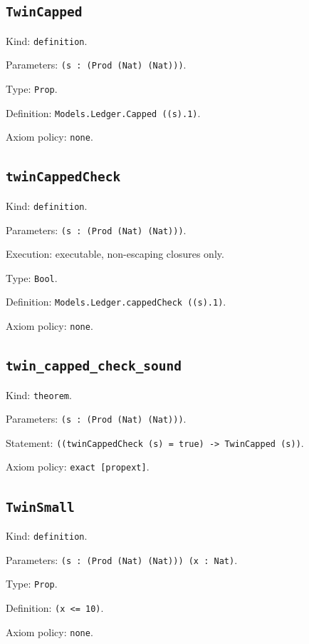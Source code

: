 \documentclass[11pt]{article}
\begin{document}
\subsection*{\texttt{TwinCapped}}
\noindent Kind: \texttt{definition}.\par
\noindent Parameters: \texttt{(s : (Prod (Nat) (Nat)))}.\par
\noindent Type: \texttt{Prop}.\par
\noindent Definition: \texttt{Models.Ledger.Capped ((s).1)}.\par
\noindent Axiom policy: \texttt{none}.\par
\subsection*{\texttt{twinCappedCheck}}
\noindent Kind: \texttt{definition}.\par
\noindent Parameters: \texttt{(s : (Prod (Nat) (Nat)))}.\par
\noindent Execution: executable, non-escaping closures only.\par
\noindent Type: \texttt{Bool}.\par
\noindent Definition: \texttt{Models.Ledger.cappedCheck ((s).1)}.\par
\noindent Axiom policy: \texttt{none}.\par
\subsection*{\texttt{twin\_capped\_check\_sound}}
\noindent Kind: \texttt{theorem}.\par
\noindent Parameters: \texttt{(s : (Prod (Nat) (Nat)))}.\par
\noindent Statement: \texttt{((twinCappedCheck (s) = true) -> TwinCapped (s))}.\par
\noindent Axiom policy: \texttt{exact [propext]}.\par
\subsection*{\texttt{TwinSmall}}
\noindent Kind: \texttt{definition}.\par
\noindent Parameters: \texttt{(s : (Prod (Nat) (Nat))) (x : Nat)}.\par
\noindent Type: \texttt{Prop}.\par
\noindent Definition: \texttt{(x <= 10)}.\par
\noindent Axiom policy: \texttt{none}.\par
\end{document}
